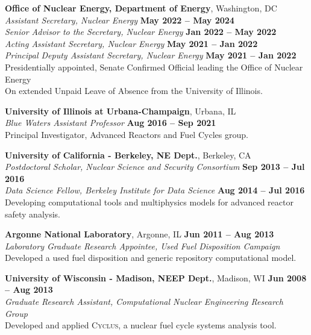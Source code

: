 \documentclass[margin,line]{resume}
\newcommand{\Cyclus}{\textsc{Cyclus}\xspace}%
\begin{document}
\begin{resume}
    \textbf{Office of Nuclear Energy, Department of Energy}, Washington, DC\\
                \textsl{Assistant Secretary, Nuclear Energy} \hfill \textbf{May 2022 -- May 2024}\\
                \textsl{Senior Advisor to the Secretary, Nuclear Energy} \hfill \textbf{Jan 2022 -- May 2022}\\
                \textsl{Acting Assistant Secretary, Nuclear Energy} \hfill \textbf{May 2021 -- Jan 2022}\\
                \textsl{Principal Deputy Assistant Secretary, Nuclear Energy} \hfill \textbf{May 2021 -- Jan 2022}\\
                Presidentially appointed, Senate Confirmed Official leading the Office of Nuclear Energy\\
                On extended Unpaid Leave of Absence from the University of Illinois.

    \textbf{University of Illinois at Urbana-Champaign}, Urbana, IL\\
                \textsl{Blue Waters Assistant Professor} \hfill \textbf{Aug 2016 -- Sep 2021}\\
                Principal Investigator, Advanced Reactors and Fuel Cycles group.

    \textbf{University of California - Berkeley, NE Dept.}, Berkeley, CA \\
                \textsl{Postdoctoral Scholar, Nuclear Science and Security Consortium} \hfill \textbf{Sep 2013 -- Jul 2016}\\
                \textsl{Data Science Fellow, Berkeley Institute for Data Science} \hfill \textbf{Aug 2014 -- Jul 2016}\\
                Developing computational tools and multiphysics models for advanced reactor safety analysis.

    \textbf{Argonne National Laboratory}, Argonne, IL \hfill \textbf{Jun 2011 -- Aug 2013}\\
                \textsl{Laboratory Graduate Research Appointee, Used Fuel Disposition Campaign}\\
                Developed a used fuel disposition and generic repository computational model.

    \textbf{University of Wisconsin - Madison, NEEP Dept.}, Madison, WI \hfill \textbf{Jun 2008 -- Aug 2013}\\
                \textsl{Graduate Research Assistant, Computational Nuclear Engineering Research Group}\\
                Developed and applied \Cyclus, a nuclear fuel cycle systems analysis tool.


\end{resume}
\end{document}
